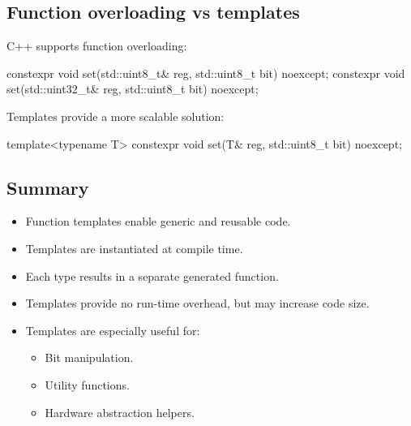 \subsection{Function overloading vs templates}
\label{c5:sec:overloading}
C++ supports function overloading:

\begin{cppcode}
constexpr void set(std::uint8_t& reg, std::uint8_t bit) noexcept;
constexpr void set(std::uint32_t& reg, std::uint8_t bit) noexcept;
\end{cppcode}

\noindent Templates provide a more scalable solution:

\begin{cppcode}
template<typename T>
constexpr void set(T& reg, std::uint8_t bit) noexcept;
\end{cppcode}

\subsection{Summary}
\label{c5:sec:functionsummary}
\begin{itemize}
  \item Function templates enable generic and reusable code.
  \item Templates are instantiated at compile time.
  \item Each type results in a separate generated function.
  \item Templates provide no run-time overhead, but may increase code size.
  \item Templates are especially useful for:
  \begin{itemize}
    \item Bit manipulation.
    \item Utility functions.
    \item Hardware abstraction helpers.
  \end{itemize}
\end{itemize}
